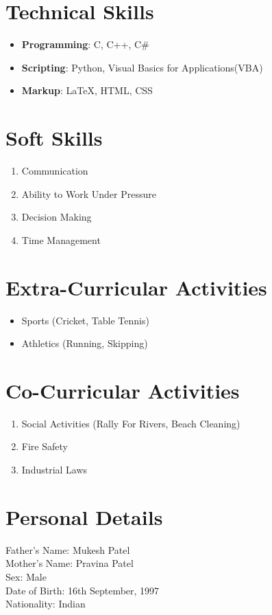 \documentclass{article}
\begin{document}
\section{Technical Skills}
	\begin{itemize}
		\item \textbf{Programming}: C, C++, C\#
		\item \textbf{Scripting}: Python, Visual Basics for Applications(VBA)
		\item \textbf{Markup}: {\LaTeX}, HTML, CSS
	\end{itemize}

\section{Soft Skills}
	\begin{enumerate}
		\item Communication
		\item Ability to Work Under Pressure
		\item Decision Making
		\item Time Management
	\end{enumerate}

\section{Extra-Curricular Activities}
	\begin{itemize}
		\item Sports (Cricket, Table Tennis)
		\item Athletics (Running, Skipping)
	\end{itemize}

\section{Co-Curricular Activities}
	\begin{enumerate}
		\item Social Activities (Rally For Rivers, Beach Cleaning)
		\item Fire Safety
		\item Industrial Laws
	\end{enumerate}

\section{Personal Details}
	Father's Name: Mukesh Patel\\
	Mother's Name: Pravina Patel\\
	Sex: Male\\
	Date of Birth: 16th September, 1997\\
	Nationality: Indian\\
	
\end{document}
